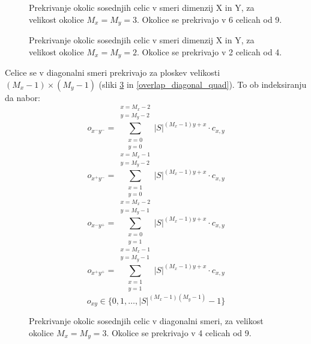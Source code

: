 \documentclass[12pt,a4paper,openany,twoside]{book}
\begin{document}
\begin{figure}[htb]
\centerline{}
\caption[Prekrivaje okolic \(3 \times 3\) v smeri dimenzij X in Y.]
{Prekrivanje okolic sosednjih celic v smeri dimenzij X in Y, za velikost okolice \(M_x=M_y=3\).
Okolice se prekrivajo v 6 celicah od 9.}
\label{overlap_dimension_moore}
\end{figure}

\begin{figure}[htb]
\centerline{}
\caption[Prekrivaje okolic \(2 \times 2\) v smeri dimenzij X in Y.]
{Prekrivanje okolic sosednjih celic v smeri dimenzij X in Y, za velikost okolice \(M_x=M_y=2\).
Okolice se prekrivajo v 2 celicah od 4.}
\label{overlap_dimension_quad}
\end{figure}

Celice se v diagonalni smeri prekrivajo za ploskev velikosti \((M_x-1) \times (M_y-1)\) (sliki \ref{overlap_diagonal_moore} in \ref{overlap_diagonal_quad}).
To ob indeksiranju da nabor:
\begin{equation}
o_{{x^-}{y^-}} = \sum_{\substack{x=0 \\ y=0}}^{\substack{x=M_x-2 \\ y=M_y-2}} |S|^{(M_x-1) y + x} \cdot c_{x,y}
\end{equation}
\begin{equation}
o_{{x^+}{y^-}} = \sum_{\substack{x=1 \\ y=0}}^{\substack{x=M_x-1 \\ y=M_y-2}} |S|^{(M_x-1) y + x} \cdot c_{x,y}
\end{equation}
\begin{equation}
o_{{x^-}{y^+}} = \sum_{\substack{x=0 \\ y=1}}^{\substack{x=M_x-2 \\ y=M_y-1}} |S|^{(M_x-1) y + x} \cdot c_{x,y}
\end{equation}
\begin{equation}
o_{{x^+}{y^+}} = \sum_{\substack{x=1 \\ y=1}}^{\substack{x=M_x-1 \\ y=M_y-1}} |S|^{(M_x-1) y + x} \cdot c_{x,y}
\end{equation}
\begin{equation}
o_{xy} \in \{0, 1, \ldots, |S|^{(M_x-1)(M_y-1)}-1\}
\end{equation}

\begin{figure}[htb]
\centerline{}
\caption[Prekrivanje okolic \(3 \times 3\) - diagonalno.]
{Prekrivanje okolic sosednjih celic v diagonalni smeri, za velikost okolice \(M_x=M_y=3\).
Okolice se prekrivajo v 4 celicah od 9.}
\label{overlap_diagonal_moore}
\end{figure}
\end{document}
